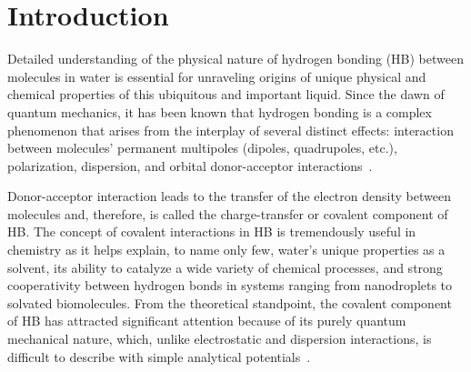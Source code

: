 \documentclass[aps,prl,reprint,amsmath,amssymb]{revtex4-1}
\begin{document}
\section{Introduction} 

Detailed understanding of the physical nature of hydrogen bonding (HB) between molecules in water is essential for unraveling origins of unique physical and chemical properties of this ubiquitous and important liquid. 
Since the dawn of quantum mechanics, it has been known that hydrogen bonding is a complex phenomenon that arises from the interplay of several distinct effects: interaction between molecules’ permanent multipoles (dipoles, quadrupoles, etc.), polarization, dispersion, and orbital donor-acceptor interactions~\cite{eisenberg2005structure}.

Donor-acceptor interaction leads to the transfer of the electron density between molecules and, therefore, is called the charge-transfer or covalent component of HB. 
The concept of covalent interactions in HB is tremendously useful in chemistry 
as it helps explain, to name only few, water's unique properties as a solvent, its ability to catalyze a wide variety of chemical processes, and strong cooperativity between hydrogen bonds in systems ranging from nanodroplets to solvated biomolecules. 
From the theoretical standpoint, the covalent component of HB has attracted significant attention because of its purely quantum mechanical nature, which, unlike electrostatic and dispersion interactions, is difficult to describe with simple analytical potentials~\cite{lee2011ctpotential, gordon2013ctefp}.

\end{document}
